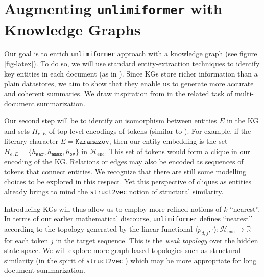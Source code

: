 \section*{Augmenting \texttt{unlimiformer} with Knowledge Graphs}  Our goal is
to enrich \texttt{unlimiformer} approach with a knowledge graph (see figure
\ref{fig-latex}). To do so, we will use standard entity-extraction techniques
to identify key entities in each document (as in \cite{wu2020extracting}).
Since KGs store richer information than a plain datastores, we aim to show that
they enable us to generate more accurate and coherent summaries. We draw
inspiration from \cite{wang2022multi} in the related task of multi-document
summarization.

Our second step will be to identify an isomorphism between entities $E$ in the
KG and sets $H_{e, E}$ of top-level encodings of tokens (similar to
\cite{galkin2021nodepiece}). For example, if the
literary character $E = \texttt{Karamazov}$, then our entity embedding is the
set $H_{e, E} = \{h_\texttt{Kar}, h_\texttt{amaz}, h_\texttt{ov}\}$ in
$\mathcal H_\text{enc}$. This set of tokens would form a clique in our encoding
of the KG. Relations or edges may also be encoded as sequences of tokens that
connect entities. We recognize that there are still some modelling choices to
be explored in this respect. Yet this perspective of cliques as entities
already brings to mind the \texttt{struct2vec} notion of structural similarity.

Introducing KGs will thus allow us to employ more refined notions of
$k$-``nearest''. In terms of our earlier mathematical discourse,
\texttt{unlimiformer} defines ``nearest’’ according to the topology generated
by the linear functional $\langle p_{d, j}, \cdot \rangle : \mathcal
H_\text{enc} \rightarrow \mathbb R$ for each token $j$ in the target sequence.
This is the \emph{weak topology} over the hidden state space. We will explore
more graph-based topologies such as  structural similarity (in the spirit of
\texttt{struct2vec} \cite{ribeiro2017struc2vec}) which may be more appropriate
for long document summarization.

%
%
